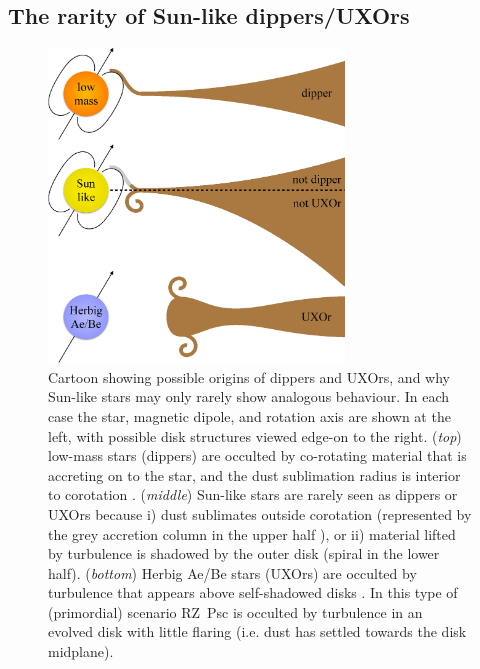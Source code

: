 \documentclass[]{rsos}
\begin{document}
\subsection{The rarity of Sun-like dippers/UXOrs}\label{ss:rarity}

\begin{figure}
  \begin{center}
    \hspace{-0.5cm} \includegraphics[width=0.7\textwidth]{figs/cartoon-crop.ps}
    \caption{Cartoon showing possible origins of dippers and UXOrs, and why Sun-like
      stars may only rarely show analogous behaviour. In each case the star, magnetic
      dipole, and rotation axis are shown at the left, with possible disk structures
      viewed edge-on to the right. (\emph{top}) low-mass stars (dippers) are occulted by
      co-rotating material that is accreting on to the star, and the dust sublimation
      radius is interior to corotation \cite{2016arXiv160503985B}. (\emph{middle})
      Sun-like stars are rarely seen as dippers or UXOrs because i) dust sublimates
      outside corotation (represented by the grey accretion column in the upper half
      \cite{2016arXiv160503985B}), or ii) material lifted by turbulence is shadowed by
      the outer disk (spiral in the lower half). (\emph{bottom}) Herbig Ae/Be stars
      (UXOrs) are occulted by turbulence that appears above self-shadowed disks
      \cite{2003ApJ...594L..47D}. In this type of (primordial) scenario RZ~Psc is
      occulted by turbulence in an evolved disk with little flaring (i.e. dust has
      settled towards the disk midplane).}\label{fig:cartoon}
  \end{center}
\end{figure}
\end{document}
